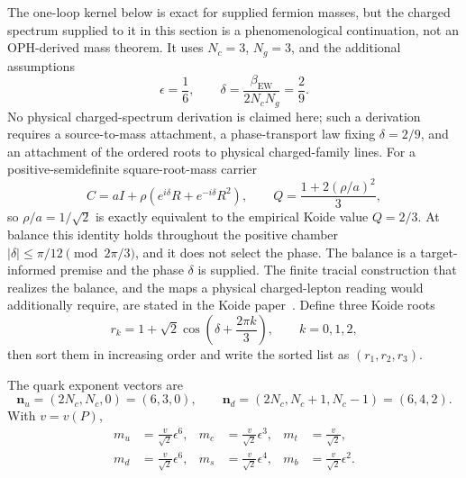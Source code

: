 \documentclass[11pt]{article}
\theoremstyle{remark}
\newcommand{\Nc}{N_c}
\newcommand{\Ng}{N_g}
\begin{document}
The one-loop kernel below is exact for supplied fermion masses, but the charged
spectrum supplied to it in this section is a phenomenological continuation,
not an OPH-derived mass theorem.  It uses \(\Nc=3\), \(\Ng=3\), and the
additional assumptions
\begin{equation}
\epsilon=\frac16,
\qquad
\delta=\frac{\beta_{\mathrm{EW}}}{2\Nc\Ng}
=\frac{2}{9}.
\label{eq:epsdelta}
\end{equation}
No physical charged-spectrum derivation is claimed here; such a derivation
requires a source-to-mass attachment, a phase-transport law fixing \(\delta=2/9\),
and an attachment of the ordered roots to physical charged-family lines. For a
positive-semidefinite square-root-mass carrier
\[
C=aI+\rho(e^{i\delta}R+e^{-i\delta}R^2),
\qquad
Q=\frac{1+2(\rho/a)^2}{3},
\]
so \(\rho/a=1/\sqrt2\) is exactly equivalent to the empirical Koide value
\(Q=2/3\). At balance this identity holds throughout the positive
chamber \(|\delta|\leq\pi/12\pmod{2\pi/3}\), and it does not select the phase.
The balance is a target-informed premise and the phase \(\delta\) is
supplied. The finite tracial construction that realizes the balance, and
the maps a physical charged-lepton reading would additionally require, are
stated in the Koide paper~\cite{oph-koide}.
Define three Koide roots
\begin{equation}
r_k=1+\sqrt2\cos\!\left(\delta+\frac{2\pi k}{3}\right),
\qquad k=0,1,2,
\label{eq:koide}
\end{equation}
then sort them in increasing order and write the sorted list as
\((r_1,r_2,r_3)\).

The quark exponent vectors are
\begin{equation}
\bm n_u=(2\Nc,\Nc,0)=(6,3,0),
\qquad
\bm n_d=(2\Nc,\Nc+1,\Nc-1)=(6,4,2).
\label{eq:quarkexponents}
\end{equation}
With \(v=v(P)\),
\begin{align}
m_u&=\frac{v}{\sqrt2}\epsilon^6,
&
m_c&=\frac{v}{\sqrt2}\epsilon^3,
&
m_t&=\frac{v}{\sqrt2},\\
m_d&=\frac{v}{\sqrt2}\epsilon^6,
&
m_s&=\frac{v}{\sqrt2}\epsilon^4,
&
m_b&=\frac{v}{\sqrt2}\epsilon^2.
\label{eq:quarkmasses}
\end{align}
\end{document}
